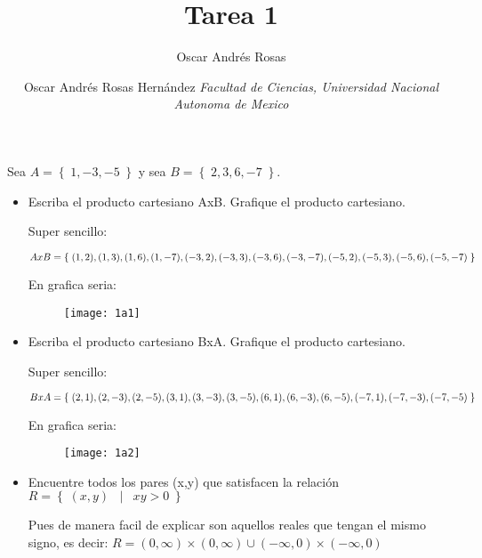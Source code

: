 \documentclass[journal,onecolumn,10pt,fleqn]{IEEEtran}%
\author{Oscar Andrés Rosas}                                     %
\DeclareMathOperator \Space     {\quad}                         %
\DeclareMathOperator \MiniSpace {\;}                            %
\newcommand \Such           {\MiniSpace | \MiniSpace}           %
\theoremstyle{break}                                            %
\newcommand{\Set}[1]            {\left\{ \; #1 \; \right\}}     %
\begin{document}
\title{Tarea 1}

\author{
    Oscar Andrés Rosas Hernández
    \textit{
        Facultad de Ciencias, Universidad Nacional Autonoma de Mexico
    }
}




\maketitle


\section{}
  Sea $A = \Set{1, -3, -5}$ y sea $B = \Set{2, 3, 6, -7}$.


  \begin{itemize}
    \item Escriba el producto cartesiano AxB. Grafique el producto cartesiano.
    
      Super sencillo: 
      
      \begin{equation}
        A x B = \Set{
        (1, 2), (1, 3), (1, 6),  (1, -7), \\
        (-3, 2), (-3, 3), (-3, 6),  (-3, -7), \\
        (-5, 2), (-5, 3), (-5, 6),  (-5, -7)}
      \end{equation}

      En grafica seria:
      \begin{figure}[ht]
        \texttt{[image: 1a1]}
      \end{figure}

    \item Escriba el producto cartesiano BxA. Grafique el producto cartesiano.
      
      Super sencillo: 
      
      \begin{equation}
        B x A = \Set{
        (2, 1), (2, -3), (2, -5), \\
        (3, 1), (3, -3), (3, -5), \\
        (6, 1), (6, -3), (6, -5), \\
        (-7, 1), (-7, -3), (-7, -5)}
      \end{equation}

      En grafica seria:
      \begin{figure}[ht]
        \texttt{[image: 1a2]}
      \end{figure}

    
    \item Encuentre todos los pares (x,y) que satisfacen la relación
      $R = \Set{(x, y) \Such xy > 0}$

      Pues de manera facil de explicar son aquellos reales 
      que tengan el mismo signo, es decir:
      $R = (0, \infty) \times (0, \infty) \cup (-\infty, 0) \times (-\infty, 0)$

\end{itemize}
\end{document}
